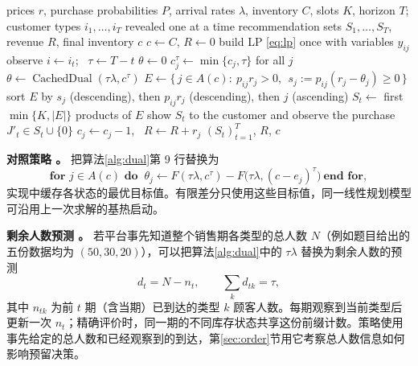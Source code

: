 \setcounter{algorithm}{1}%
\begin{algorithm}[htbp]
\caption{\LPDual{}：基于线性规划对偶价格的在线 Top-$K$ 推荐}
\label{alg:dual}
\begin{algorithmic}[1]
\Require prices $r$, purchase probabilities $P$, arrival rates $\lambda$, inventory $C$, slots $K$, horizon $T$; customer types $i_1,\ldots,i_T$ revealed one at a time
\Ensure recommendation sets $S_1,\ldots,S_T$, revenue $R$, final inventory $c$
\State $c\gets C$, $R\gets 0$
\State build LP \eqref{eq:lp} once with variables $y_{ij}$ 
  \State observe $i\gets i_t$; \ $\tau\gets T-t$ 
    \State $\theta\gets 0$
  \Else
    \State $c^{\tau}_j\gets\min\{c_j,\tau\}$ for all $j$
    \State $\theta\gets\operatorname{CachedDual}(\tau\lambda,c^{\tau})$ 
  \EndIf
  \State $E\gets\{\,j\in A(c):\ p_{ij}r_j>0,\ \ s_j:=p_{ij}(r_j-\theta_j)\ge 0\,\}$
  \State sort $E$ by $s_j$ (descending), then $p_{ij}r_j$ (descending), then $j$ (ascending)
  \State $S_t\gets$ first $\min\{K,|E|\}$ products of $E$
  \State show $S_t$ to the customer and observe the purchase $J'_t\in S_t\cup\{0\}$
    \State $c_j\gets c_j-1$, \ $R\gets R+r_j$
  \EndIf
\EndFor
\State \Return $(S_t)_{t=1}^{T}$, $R$, $c$
\end{algorithmic}
\end{algorithm}

\textbf{对照策略 \LPFD{}。} 把算法\ref{alg:dual}第 9 行替换为
\begin{equation*}
\textbf{for } j\in A(c)\textbf{ do }\ \theta_j\gets F(\tau\lambda,c^{\tau})-F\bigl(\tau\lambda,(c-e_j)^{\tau}\bigr)\ \textbf{end for},
\end{equation*}
实现中缓存各状态的最优目标值。有限差分只使用这些目标值，同一线性规划模型可沿用上一次求解的基热启动。

\textbf{剩余人数预测 \LPCount{}。} 若平台事先知道整个销售期各类型的总人数 $N$（例如题目给出的五份数据均为 $(50,30,20)$），可以把算法\ref{alg:dual}中的 $\tau\lambda$ 替换为剩余人数的预测
\begin{equation}
d_t=N-n_t,\qquad \sum_k d_{tk}=\tau,
\label{eq:countforecast}
\end{equation}
其中 $n_{tk}$ 为前 $t$ 期（含当期）已到达的类型 $k$ 顾客人数。每期观察到当前类型后更新一次 $n_t$；精确评价时，同一期的不同库存状态共享这份前缀计数。策略使用事先给定的总人数和已经观察到的到达，第\ref{sec:order}节用它考察总人数信息如何影响预留决策。

